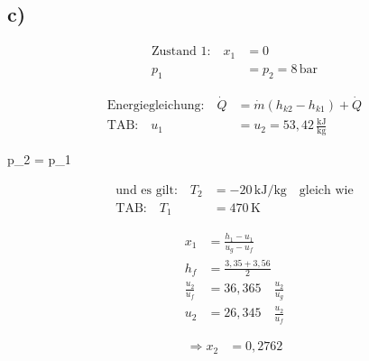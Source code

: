 

\subsection*{c)}
\begin{align*}
    \text{Zustand 1:} \quad x_1 &= 0 \\
    p_1 &= p_2 = 8 \, \text{bar}
\end{align*}


\begin{align*}
    \text{Energiegleichung:} \quad \dot{Q} &= \dot{m} \left( h_{k2} - h_{k1} \right) + \dot{Q} \\
    \text{TAB:} \quad u_1 &= u_2 = 53,42 \, \frac{\text{kJ}}{\text{kg}}
\end{align*}

 \quad {} \quad p_2 = p_1

\begin{align*}
    \text{und es gilt:} \quad T_2 &= -20 \, \text{kJ/kg} \quad \text{gleich wie} \\
    \text{TAB:} \quad T_1 &= 470 \, \text{K}
\end{align*}

\begin{align*}
    x_1 &= \frac{h_1 - u_1}{u_g - u_f} \\
    h_f &= \frac{3,35 + 3,56}{2} \\
    \frac{u_2}{u_f} &= 36,365 \quad \frac{u_2}{u_g} \\
    u_2 &= 26,345 \quad \frac{u_2}{u_f}
\end{align*}

\begin{align*}
    \Rightarrow x_2 &= 0,2762
\end{align*}